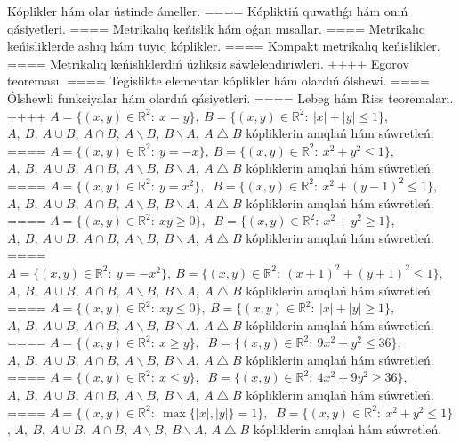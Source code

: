 Kóplikler hám olar ústinde ámeller.
====
Kópliktiń quwatlıǵı hám onıń qásiyetleri.
====
Metrikalıq keńislik hám oǵan mısallar.
====
Metrikalıq keńisliklerde ashıq hám tuyıq kóplikler.
====
Kompakt metrikalıq keńislikler.
====
Metrikalıq keńisliklerdiń úzliksiz sáwlelendiriwleri.
++++
Egorov teoreması.
====
Tegislikte elementar kóplikler hám olardıń ólshewi.
====
Ólshewli funkciyalar hám olardıń qásiyetleri.
====
Lebeg hám Riss teoremaları.
++++
\(A = \{(x,y) \in \mathbb{R}^{2}:\ x = y\},\ B = \{(x,y) \in \mathbb{R}^{2}:\ |x| + |y| \leq 1\}\), \(A,\ B,\ A \cup B,\ A \cap B,\ A \backslash B,\ B \backslash A,\ A \bigtriangleup B\) kópliklerin anıqlań hám súwretleń.
====
\(A = \{(x,y) \in \mathbb{R}^{2}:\ y = - x\},\ B = \{(x,y) \in \mathbb{R}^{2}:\ x^{2} + y^{2} \leq 1\}\), \(A,\ B,\ A \cup B,\ A \cap B,\ A \backslash B,\ B \backslash A,\ A \bigtriangleup B\) kópliklerin anıqlań hám súwretleń.
====
\(A = \{(x,y) \in \mathbb{R}^{2}:\ y = x^{2}\},\) \(\ B = \{(x,y) \in \mathbb{R}^{2}:\ x^{2} + (y - 1)^{2} \leq 1\}\), \(A,\ B,\ A \cup B,\ A \cap B,\ A \backslash B,\ B \backslash A,\ A \bigtriangleup B\) kópliklerin anıqlań hám súwretleń.
====
\(A = \{(x,y) \in \mathbb{R}^{2}:\ xy \geq 0\},\) \(\ B = \{(x,y) \in \mathbb{R}^{2}:\ x^{2} + y^{2} \geq 1\}\), \(A,\ B,\ A \cup B,\ A \cap B,\ A \backslash B,\ B \backslash A,\ A \bigtriangleup B\) kópliklerin anıqlań hám súwretleń.
====
\(A = \{(x,y) \in \mathbb{R}^{2}:\ y = - x^{2}\},\ B = \{(x,y) \in \mathbb{R}^{2}:\ (x + 1)^{2} + (y + 1)^{2} \leq 1\}\), \(A,\ B,\ A \cup B,\ A \cap B,\ A \backslash B,\ B \backslash A,\ A \bigtriangleup B\) kópliklerin anıqlań hám súwretleń.
====
\(A = \{(x,y) \in \mathbb{R}^{2}:\ xy \leq 0\},\ B = \{(x,y) \in \mathbb{R}^{2}:\ |x| + |y| \geq 1\}\), \(A,\ B,\ A \cup B,\ A \cap B,\ A \backslash B,\ B \backslash A,\ A \bigtriangleup B\) kópliklerin anıqlań hám súwretleń.
====
\(A = \{(x,y) \in \mathbb{R}^{2}:\ x \geq y\},\) \(\ B = \{(x,y) \in \mathbb{R}^{2}:\ 9x^{2} + y^{2} \leq 36\}\),\(A,\ B,\ A \cup B,\ A \cap B,\ A \backslash B,\ B \backslash A,\ A \bigtriangleup B\) kópliklerin anıqlań hám súwretleń.
====
\(A = \{(x,y) \in \mathbb{R}^{2}:\ x \leq y\},\) \(\ B = \{(x,y) \in \mathbb{R}^{2}:\ 4x^{2} + 9y^{2} \geq 36\}\), \(A,\ B,\ A \cup B,\ A \cap B,\ A \backslash B,\ B \backslash A,\ A \bigtriangleup B\) kópliklerin anıqlań hám súwretleń.
====
\(A = \{(x,y) \in \mathbb{R}^{2}:\ \max \{|x|,|y|\} = 1\},\) \(\ B = \{(x,y) \in \mathbb{R}^{2}:\ x^{2} + y^{2} \leq 1\}\), \(A,\ B,\ A \cup B,\ A \cap B,\ A \backslash B,\ B \backslash A,\ A \bigtriangleup B\) kópliklerin anıqlań hám súwretleń.
